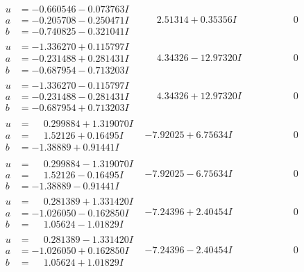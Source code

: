 \documentclass[1p]{elsarticle_modified}
\theoremstyle{definition}
\begin{document}
$$\begin{array}{c|c|c}
\begin{aligned}
u &= -0.660546 - 0.073763 I \\
a &= -0.205708 - 0.250471 I \\
b &= -0.740825 - 0.321041 I\end{aligned}
 & \phantom{-}2.51314 + 0.35356 I & \phantom{-0.000000 } 0 \\ \hline\begin{aligned}
u &= -1.336270 + 0.115797 I \\
a &= -0.231488 + 0.281431 I \\
b &= -0.687954 - 0.713203 I\end{aligned}
 & \phantom{-}4.34326 - 12.97320 I & \phantom{-0.000000 } 0 \\ \hline\begin{aligned}
u &= -1.336270 - 0.115797 I \\
a &= -0.231488 - 0.281431 I \\
b &= -0.687954 + 0.713203 I\end{aligned}
 & \phantom{-}4.34326 + 12.97320 I & \phantom{-0.000000 } 0 \\ \hline\begin{aligned}
u &= \phantom{-}0.299884 + 1.319070 I \\
a &= \phantom{-}1.52126 + 0.16495 I \\
b &= -1.38889 + 0.91441 I\end{aligned}
 & -7.92025 + 6.75634 I & \phantom{-0.000000 } 0 \\ \hline\begin{aligned}
u &= \phantom{-}0.299884 - 1.319070 I \\
a &= \phantom{-}1.52126 - 0.16495 I \\
b &= -1.38889 - 0.91441 I\end{aligned}
 & -7.92025 - 6.75634 I & \phantom{-0.000000 } 0 \\ \hline\begin{aligned}
u &= \phantom{-}0.281389 + 1.331420 I \\
a &= -1.026050 - 0.162850 I \\
b &= \phantom{-}1.05624 - 1.01829 I\end{aligned}
 & -7.24396 + 2.40454 I & \phantom{-0.000000 } 0 \\ \hline\begin{aligned}
u &= \phantom{-}0.281389 - 1.331420 I \\
a &= -1.026050 + 0.162850 I \\
b &= \phantom{-}1.05624 + 1.01829 I\end{aligned}
 & -7.24396 - 2.40454 I & \phantom{-0.000000 } 0 \\ \hline\begin{aligned}

\end{aligned}
\end{array}$$
\end{document}
